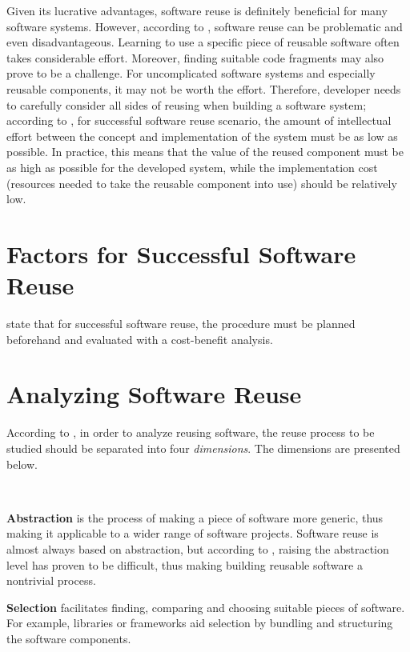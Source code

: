 Given its lucrative advantages, software reuse is definitely beneficial for many software systems. However, according to \citet{krueger_software_1992}, software reuse can be problematic and even disadvantageous. Learning to use a specific piece of reusable software often takes considerable effort. Moreover, finding suitable code fragments may also prove to be a challenge. For uncomplicated software systems and especially reusable components, it may not be worth the effort. Therefore, developer needs to carefully consider all sides of reusing when building a software system; according to \citet[chap.~1.3]{krueger_software_1992}, for successful software reuse scenario, the amount of intellectual effort between the concept and implementation of the system must be as low as possible. In practice, this means that the value of the reused component must be as high as possible for the developed system, while the implementation cost (resources needed to take the reusable component into use) should be relatively low. 

\section{Factors for Successful Software Reuse}
\citet{frakes_success_1994} state that for successful software reuse, the procedure must be planned beforehand and evaluated with a cost-benefit analysis.  

\section{Analyzing Software Reuse}
According to \citet{krueger_software_1992}, in order to analyze reusing software, the reuse process to be studied should be separated into four \emph{dimensions}. The dimensions are presented below.

~

\textbf{Abstraction} is the process of making a piece of software more generic, thus making it applicable to a wider range of software projects. Software reuse is almost always based on abstraction, but according to \citet{krueger_software_1992}, raising the abstraction level has proven to be difficult, thus making building reusable software a nontrivial process.\newline

\textbf{Selection} facilitates finding, comparing and choosing suitable pieces of software. For example, libraries or frameworks aid selection by bundling and structuring the software components.\newline

